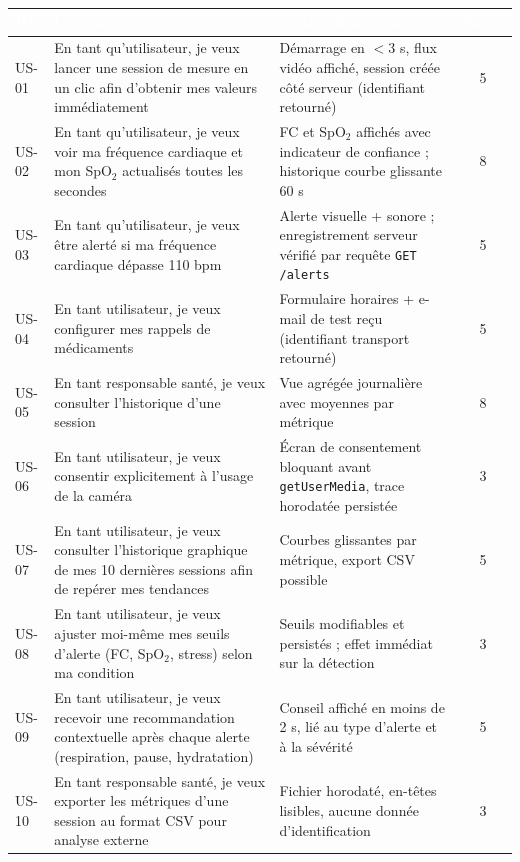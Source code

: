 \documentclass[11pt,a4paper]{article}
\renewcommand{\arraystretch}{1.45}
\begin{document}
\begin{table}[!htbp]
\centering\footnotesize\renewcommand{\arraystretch}{1.12}
\begin{tabularx}{\linewidth}{l X p{6.6cm} c}
\toprule
\rowcolor{cwblue} \textcolor{white}{\bf ID} & \textcolor{white}{\bf User story} & \textcolor{white}{\bf Critère
d'acceptation} & \textcolor{white}{\bf Points} \\
\midrule
US-01 & En tant qu'utilisateur, je veux lancer une session de mesure en un clic afin d'obtenir mes
 valeurs immédiatement & Démarrage en $< 3$ s, flux vidéo affiché, session créée côté serveur
 (identifiant retourné) & 5 \\
US-02 & En tant qu'utilisateur, je veux voir ma fréquence cardiaque et mon SpO$_2$ actualisés toutes les
 secondes & FC et SpO$_2$ affichés avec indicateur de confiance ; historique courbe glissante 60 s & 8 \\
US-03 & En tant qu'utilisateur, je veux être alerté si ma fréquence cardiaque dépasse 110 bpm & Alerte
 visuelle + sonore ; enregistrement serveur vérifié par requête \texttt{GET /alerts} & 5 \\
US-04 & En tant utilisateur, je veux configurer mes rappels de médicaments & Formulaire horaires +
 e-mail de test reçu (identifiant transport retourné) & 5 \\
US-05 & En tant responsable santé, je veux consulter l'historique d'une session & Vue agrégée journalière
 avec moyennes par métrique & 8 \\
US-06 & En tant utilisateur, je veux consentir explicitement à l'usage de la caméra & Écran de
 consentement bloquant avant \texttt{getUserMedia}, trace horodatée persistée & 3 \\
US-07 & En tant utilisateur, je veux consulter l'historique graphique de mes 10 dernières
 sessions afin de repérer mes tendances & Courbes glissantes par métrique, export CSV possible & 5 \\
US-08 & En tant utilisateur, je veux ajuster moi-même mes seuils d'alerte (FC, SpO$_2$, stress)
 selon ma condition & Seuils modifiables et persistés ; effet immédiat sur la détection & 3 \\
US-09 & En tant utilisateur, je veux recevoir une recommandation contextuelle après chaque
 alerte (respiration, pause, hydratation) & Conseil affiché en moins de 2 s, lié au type
 d'alerte et à la sévérité & 5 \\
US-10 & En tant responsable santé, je veux exporter les métriques d'une session au format CSV
 pour analyse externe & Fichier horodaté, en-têtes lisibles, aucune donnée d'identification & 3 \\

\end{tabularx}
\end{table}
\end{document}
